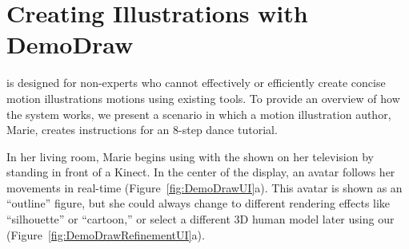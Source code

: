 
\section{Creating Illustrations with DemoDraw}

\systemname{} is designed for non-experts who cannot effectively or efficiently create concise motion illustrations motions using existing tools.
To provide an overview of how the system works, we present a scenario in which a motion illustration author, Marie, creates instructions for an 8-step dance tutorial.

In her living room, Marie begins using \systemname{} with the \phaseI{} shown on her television by standing in front of a Kinect. In the center of the display, an avatar follows her movements in real-time (Figure~\ref{fig:DemoDrawUI}a).
This avatar is shown as an ``outline'' figure, but she could always change to different rendering effects like ``silhouette'' or ``cartoon,'' or select a different 3D human model later using our \phaseII{} (Figure~\ref{fig:DemoDrawRefinementUI}a).

